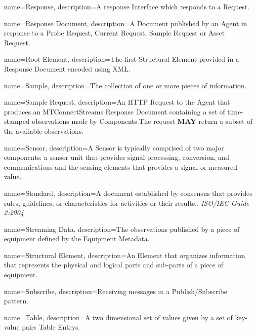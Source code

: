 {
    name={Response},
	description={A response \gls{Interface} which responds to a \gls{Request}.}
}

{
    name={Response Document},
	description={A \gls{Document} published by an \gls{Agent} in response to a \gls{Probe Request}, \gls{Current Request}, \gls{Sample Request} or \gls{Asset Request}.}
}

{
    name={Root Element},
	description={The first \gls{Structural Element} provided in a \gls{Response Document} encoded using XML. }
}

{
    name={Sample},
	description={The collection of one or more pieces of information.  
}
}

{
    name={Sample Request},
	description={An \gls{HTTP Request} to the \gls{Agent} that produces an \gls{MTConnectStreams Response Document} containing a set of time-stamped \glspl{observation} made by \glspl{Component}.The request \textbf{MAY} return a subset of the available \glspl{observation}.}
}

{
    name={Sensor},
	description={A \gls{Sensor} is typically comprised of two major components: a \gls{sensor unit} that provides signal processing, conversion, and communications and the \glspl{sensing element} that provides a signal or measured value.}
}

{
    name={Standard},
	description={A document established by consensus that provides rules, guidelines, or characteristics for activities or their results.. \textit{ISO/IEC Guide 2:2004}}
}

{
    name={Streaming Data},
	description={The \glspl{observation} published by a piece of equipment defined by the \gls{Equipment Metadata}.}
}

{
    name={Structural Element},
	description={An \gls{Element} that organizes information that represents the physical and logical parts and sub-parts of a piece of equipment.}
}

{
    name={Subscribe},
	description={Receiving messages in a \gls{Publish/Subscribe} pattern.}
}

{
    name={Table},
	description={A two dimensional set of values given by a set of \glspl{key-value pair} \glspl{Table Entry}. }
}


